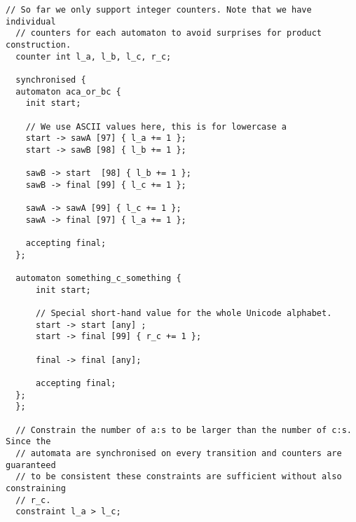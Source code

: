 \documentclass[acmsmall,review,anonymous,screen]{acmart}\settopmatter{printfolios=true,printccs=false,printacmref=true}
\theoremstyle{definition}
\begin{document}
\begin{lstlisting}[caption={An example input file for \Catra{} for the problem introduced in \cref{sec:introduction:motivation}, illustrating every major syntax element. From beginning to end: synchronised (product) automata using the keyword \texttt{synchronised} (automata A and B), labels (except those with ranges), register increments, and constraints on the final values of their counters.}, label=lst:input-example]
  // So far we only support integer counters. Note that we have individual
  // counters for each automaton to avoid surprises for product construction.
  counter int l_a, l_b, l_c, r_c;

  synchronised {
  automaton aca_or_bc {
    init start;
  
    // We use ASCII values here, this is for lowercase a
    start -> sawA [97] { l_a += 1 };
    start -> sawB [98] { l_b += 1 };
  
    sawB -> start  [98] { l_b += 1 };
    sawB -> final [99] { l_c += 1 };
  
    sawA -> sawA [99] { l_c += 1 };
    sawA -> final [97] { l_a += 1 };
  
    accepting final;
  };
  
  automaton something_c_something {
      init start;
  
      // Special short-hand value for the whole Unicode alphabet.
      start -> start [any] ;
      start -> final [99] { r_c += 1 };
  
      final -> final [any];
  
      accepting final;
  };
  };
  
  // Constrain the number of a:s to be larger than the number of c:s. Since the
  // automata are synchronised on every transition and counters are guaranteed
  // to be consistent these constraints are sufficient without also constraining
  // r_c.
  constraint l_a > l_c;
\end{lstlisting}

\end{document}

